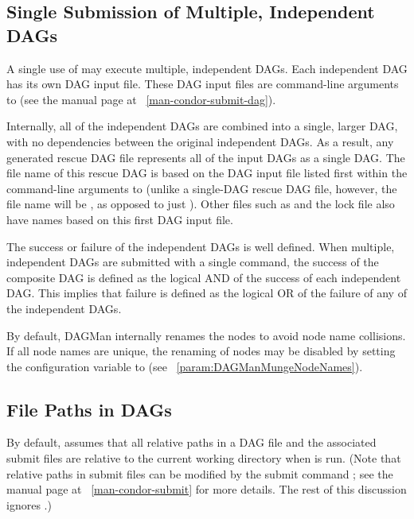 \subsection{\label{sec:MultipleDAGs}Single Submission of Multiple, Independent DAGs}

A single use of  may execute multiple, independent DAGs.
Each independent DAG has its own DAG input file.
These DAG input files are command-line arguments to
(see the  manual page at ~\ref{man-condor-submit-dag}).

Internally, all of the independent DAGs are combined
into a single, larger DAG, with no dependencies between
the original independent DAGs.
As a result,
any generated rescue DAG file represents all of the input DAGs
as a single DAG.
The file name of this rescue DAG is based on the DAG input file
listed first within the command-line arguments to
 (unlike a single-DAG rescue DAG file, however,
the file name will be
, as opposed to
just ).
Other files such
as  and the lock file also have names based on this
first DAG input file.

The success or failure of the independent DAGs is well defined.
When multiple, independent DAGs are submitted with a single
command, the
success of the composite DAG is defined as the logical AND
of the success of each independent DAG.
This implies that failure is defined as the logical OR
of the failure of any of the independent DAGs.

By default, DAGMan internally renames the nodes to avoid node name collisions.  
If all node names are unique, 
the renaming of nodes may be disabled by
setting the configuration variable 
to  (see ~\ref{param:DAGManMungeNodeNames}).

\subsection{\label{sec:DAGPaths}File Paths in DAGs}

By default,  assumes that all relative paths in a
DAG file and the associated submit files are relative to the current
working directory when  is run.  (Note that 
relative paths in submit files can be modified by the submit command
; see the  manual page at
~\ref{man-condor-submit} for more details.  The rest of this discussion
ignores .)

